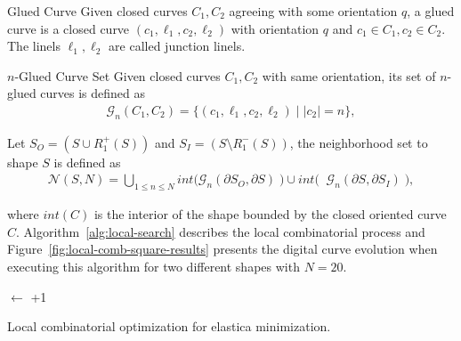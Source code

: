 \begin{definition}{Glued Curve}
Given closed curves $C_1,C_2$ agreeing with some orientation $q$, a glued curve is a closed curve  $(c_1,\ell_1,c_2,\ell_2)$ with orientation $q$ and $c_1 \in C_1, c_2 \in C_2$. The linels $\ell_1,\ell_2$ are called junction linels.
\end{definition}

\begin{definition}{$n$-Glued Curve Set}
Given closed curves $C_1,C_2$ with same orientation, its set of $n$-glued curves is defined as
\begin{align*}
	\mathcal{G}_n(C_1,C_2) = \{ (c_1,\ell_1,c_2,\ell_2) \; | \; |c_2|=n \},
\end{align*}
\end{definition}

Let $S_O = ( S \cup R_1^+(S) ) $ and $S_I = ( S \setminus R_1^-(S) ) $, the neighborhood set to shape $S$ is defined as
\begin{align*}
	\mathcal{N}(S,N) = \bigcup_{1 \leq n \leq N} int \big( \mathcal{G}_{n}(\partial S_O, \partial S) \; \big) \cup int \big( \;  \; \mathcal{G}_{n}(\partial S, \partial S_I) \; \big),
\end{align*}

where $int(C)$ is the interior of the shape bounded by the closed oriented curve $C$. Algorithm~\ref{alg:local-search} describes the local combinatorial process and Figure~\ref{fig:local-comb-square-results} presents the digital curve evolution when executing this algorithm for two different shapes with $N=20$.


\begin{algorithm}[H]
 
 \BlankLine
 \Delta $\longleftarrow$ \Tol+1\;
 \label{alg:local-search} 
 \caption{Local combinatorial optimization for elastica minimization.}
\end{algorithm}

